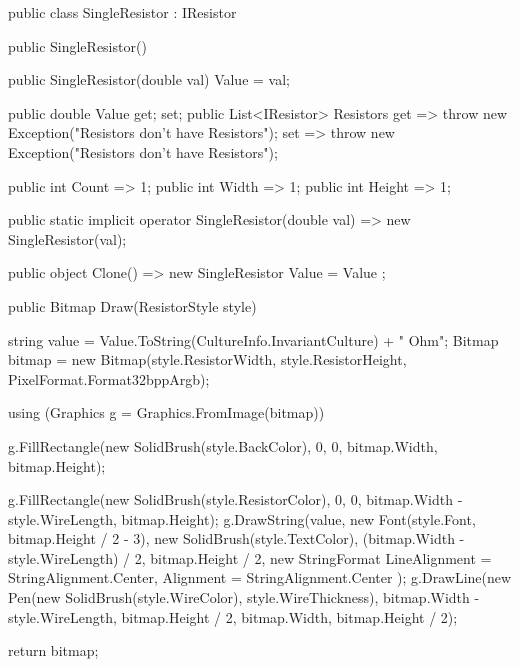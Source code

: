 \documentclass{article}
\begin{document}
\begin{Csharp}[caption=Klasse SingleResistor,label=LIS:Single] 
public class SingleResistor : IResistor
{
    public SingleResistor() { }

    public SingleResistor(double val)
    {
        Value = val;
    }

    public double Value { get; set; }
    public List<IResistor> Resistors
    {
        get => throw new Exception("Resistors don't have Resistors");
        set => throw new Exception("Resistors don't have Resistors");
    }

    public int Count => 1;
    public int Width => 1;
    public int Height => 1;

    public static implicit operator SingleResistor(double val) => new SingleResistor(val);

    public object Clone() => new SingleResistor { Value = Value };
    
    public Bitmap Draw(ResistorStyle style)
    {
        string value = Value.ToString(CultureInfo.InvariantCulture) + " Ohm";
        Bitmap bitmap = new Bitmap(style.ResistorWidth, style.ResistorHeight, PixelFormat.Format32bppArgb);

        using (Graphics g = Graphics.FromImage(bitmap))
        {
            g.FillRectangle(new SolidBrush(style.BackColor), 0, 0, bitmap.Width, bitmap.Height);

            g.FillRectangle(new SolidBrush(style.ResistorColor), 0, 0, bitmap.Width - style.WireLength, bitmap.Height);
            g.DrawString(value, new Font(style.Font, bitmap.Height / 2 - 3), new SolidBrush(style.TextColor), (bitmap.Width - style.WireLength) / 2, bitmap.Height / 2, new StringFormat
            {
                LineAlignment = StringAlignment.Center,
                Alignment = StringAlignment.Center
            });
            g.DrawLine(new Pen(new SolidBrush(style.WireColor), style.WireThickness), bitmap.Width - style.WireLength, bitmap.Height / 2, bitmap.Width, bitmap.Height / 2);
        }

        return bitmap;
    }
}
\end{Csharp}
\end{document}
